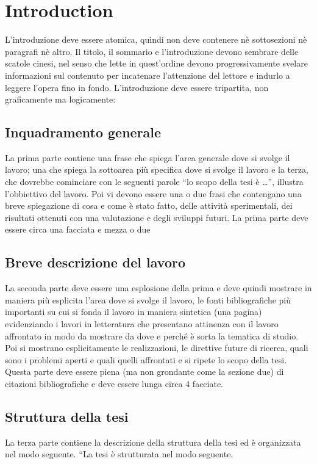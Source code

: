 \chapter{Introduction}
\label{ch1_intro}
\thispagestyle{empty}

\vspace{0.5cm}

\noindent L'introduzione deve essere atomica, quindi non deve contenere n\`e 
sottosezioni n\`e paragrafi n\`e altro. Il titolo, il sommario e l'introduzione 
devono sembrare delle scatole cinesi, nel senso che lette in quest'ordine devono 
progressivamente svelare informazioni sul contenuto per incatenare l'attenzione 
del lettore e indurlo a leggere l'opera fino in fondo. L'introduzione deve 
essere tripartita, non graficamente ma logicamente:


\section{Inquadramento generale}
La prima parte contiene una frase che spiega l'area generale dove si svolge il 
lavoro; una che spiega la sottoarea pi\`u specifica dove si svolge il lavoro e 
la terza, che dovrebbe cominciare con le seguenti parole ``lo scopo della tesi 
\`e \dots'', illustra l'obbiettivo del lavoro. Poi vi devono essere una o due 
frasi che contengano una breve spiegazione di cosa e come \`e stato fatto, delle 
attivit\`a  sperimentali, dei risultati ottenuti con una valutazione e degli 
sviluppi futuri. La prima parte deve essere circa una facciata e mezza o due


\section{Breve descrizione del lavoro}
La seconda parte deve essere una esplosione della prima e deve quindi mostrare 
in maniera pi\`u esplicita l'area dove si svolge il lavoro, le fonti 
bibliografiche pi\`u importanti su cui si fonda il lavoro in maniera sintetica 
(una pagina) evidenziando i lavori in letteratura che presentano attinenza con 
il lavoro affrontato in modo da mostrare da dove e perch\'e \`e sorta la 
tematica di studio. Poi si mostrano esplicitamente le realizzazioni, le 
direttive future di ricerca, quali sono i problemi aperti e quali quelli 
affrontati e si ripete lo scopo della tesi. Questa parte deve essere piena (ma 
non grondante come la sezione due) di citazioni bibliografiche e deve essere 
lunga circa 4 facciate.


\section{Struttura della tesi}
La terza parte contiene la descrizione della struttura della tesi ed \`e 
organizzata nel modo seguente.
``La tesi \`e strutturata nel modo seguente.

